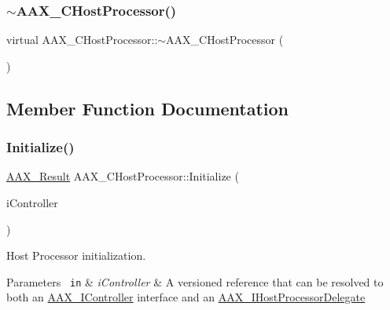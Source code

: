\mbox{\label{a01485_a292b055693eace03d45b3a550dbefa50}} 
\subsubsection{\texorpdfstring{$\sim$AAX\_CHostProcessor()}{~AAX\_CHostProcessor()}}
{\footnotesize\ttfamily virtual A\+A\+X\+\_\+\+C\+Host\+Processor\+::$\sim$\+A\+A\+X\+\_\+\+C\+Host\+Processor (\begin{DoxyParamCaption}{ }\end{DoxyParamCaption})\hspace{0.3cm}{\ttfamily [virtual]}}



\subsection{Member Function Documentation}
\mbox{\label{a01485_afa9d83145a510fb3e37a4831b0f2b3c6}} 
\subsubsection{\texorpdfstring{Initialize()}{Initialize()}}
{\footnotesize\ttfamily \mbox{\hyperlink{a00392_a4d8f69a697df7f70c3a8e9b8ee130d2f}{A\+A\+X\+\_\+\+Result}} A\+A\+X\+\_\+\+C\+Host\+Processor\+::\+Initialize (\begin{DoxyParamCaption}\item[{\mbox{\hyperlink{a01409}{I\+A\+C\+F\+Unknown}} $\ast$}]{i\+Controller }\end{DoxyParamCaption})\hspace{0.3cm}{\ttfamily [virtual]}}



Host Processor initialization. 


\begin{DoxyParams}[1]{Parameters}
\mbox{\texttt{ in}}  & {\em i\+Controller} & A versioned reference that can be resolved to both an \mbox{\hyperlink{a01789}{A\+A\+X\+\_\+\+I\+Controller}} interface and an \mbox{\hyperlink{a01837}{A\+A\+X\+\_\+\+I\+Host\+Processor\+Delegate}} \\
\hline
\end{DoxyParams}



